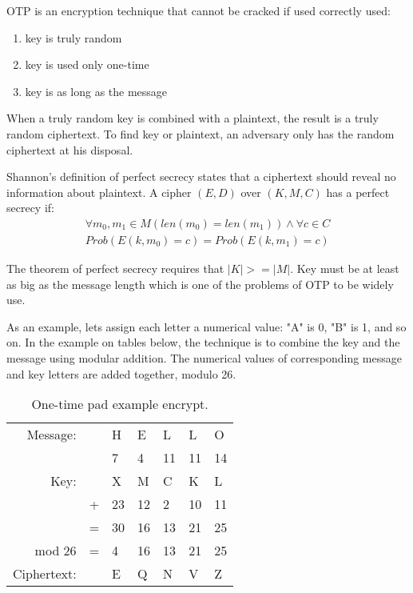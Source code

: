 \documentclass{article}
\begin{document}
OTP is an encryption technique that cannot be cracked if used correctly used:
\begin{enumerate}
  \item key is truly random
  \item key is used only one-time
  \item key is as long as the message
\end{enumerate}

When a truly random key is combined with a plaintext, the result is a truly random ciphertext. To find key or plaintext, an adversary only has the random ciphertext at his disposal.

Shannon's definition of perfect secrecy states that a ciphertext should reveal no information about plaintext. A cipher $(E, D)$ over $(K, M, C)$ has a perfect secrecy if:
\begin{eqnarray}
\label{eq:psec}
\forall m_0, m_1 \in M(len(m_0) = len(m_1)) \land \forall c \in C \nonumber \\
Prob( E(k, m_0)  = c ) = Prob( E(k, m_1) = c ) \nonumber
\end{eqnarray}

The theorem of perfect secrecy requires that $|K| >= |M|$. Key must be at least as big as the message length which is one of the problems of OTP to be widely use.

As an example, lets assign each letter a numerical value: "A" is 0, "B" is 1, and so on. In the example on tables below, the technique is to combine the key and the message using modular addition. The numerical values of corresponding message and key letters are added together, modulo 26.

\begin{table}[!htp]
 \centering
 \label{ex1}
  \begin{tabular}{r r l l l l l}
  \\ \hline
Message: &   &  H &  E &  L &  L &  O \\
         &   &  7 &  4 & 11 & 11 & 14 \\ \hline
 Key:    &   &  X &  M &  C &  K &  L \\
         & + & 23 & 12 &  2 & 10 & 11 \\ \hline
         & = & 30 & 16 & 13 & 21 & 25 \\
 mod 26  & = &  4 & 16 & 13 & 21 & 25 \\
Ciphertext: &&  E &  Q &  N &  V &  Z \\ \hline
  \end{tabular}
 \caption{One-time pad example encrypt.}
\end{table}
\end{document}
